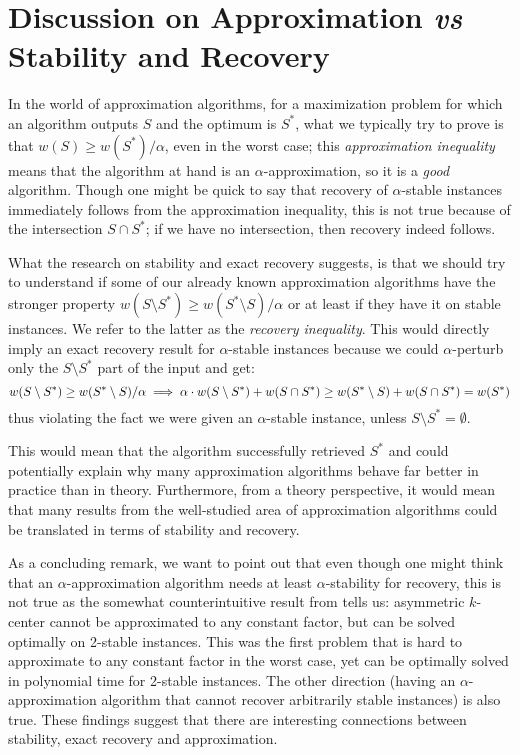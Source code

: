 \section{Discussion on Approximation \textit{vs} Stability and Recovery}\label{sec:approx-stability}


In the world of approximation algorithms, for a maximization problem for which an algorithm outputs $S$ and the optimum is $S^*$, what we typically try to prove is that
$w(S)\ge w(S^*)/\alpha$, even in the worst case; this \textit{approximation inequality} means that the algorithm at hand is an $\alpha$-approximation, so it is a \textit{good} algorithm. Though one might be quick to say that recovery of $\alpha$-stable instances immediately follows from the approximation inequality, this is not true because of the intersection $S\cap S^*$; if we have no intersection, then recovery indeed follows. 

What the research on stability and exact recovery suggests, is that we should try to understand if some of our already known approximation algorithms have the stronger property $w(S\setminus S^*)\ge w(S^*\setminus S)/\alpha$ or at least if they have it on stable instances. We refer to the latter as the \textit{recovery inequality}. This would directly imply an exact recovery result for $\alpha$-stable instances because we could $\alpha$-perturb only the $S\setminus S^*$ part of the input and get: 
\[
\noindent w(S\setminus S^*)\ge w(S^*\setminus S)/\alpha \implies \alpha\cdot w(S\setminus S^*) +w(S\cap S^*) \ge w(S^*\setminus S) +w(S\cap S^*) = w(S^*)
\] thus violating the fact we were given an $\alpha$-stable instance, unless $S\setminus S^* = \emptyset$.

This would mean that the algorithm successfully retrieved $S^*$ and could potentially explain why many approximation algorithms behave far better in practice than in theory. Furthermore, from a theory perspective, it would mean that many results from the well-studied area of approximation algorithms could be translated in terms of stability and recovery.

As a concluding remark, we want to point out that even though one might think that an $\alpha$-approximation algorithm needs at least $\alpha$-stability for recovery, this is not true as the somewhat counterintuitive result from \cite{balcan2015k} tells us: asymmetric $k$-center cannot be approximated to any constant factor, but can be solved optimally on 2-stable instances. This was the
first problem that is hard to approximate to any constant factor in the worst case, yet can be optimally
solved in polynomial time for 2-stable instances. The other direction (having an $\alpha$-approximation algorithm that cannot recover arbitrarily stable instances) is also true. These findings suggest that there are interesting connections between stability, exact recovery and approximation.
